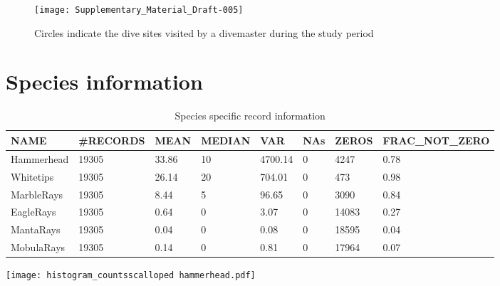 \documentclass[a4paper]{article}
\begin{document}

\begin{figure}[h!]
\texttt{[image: Supplementary\_Material\_Draft-005]}
\caption{Circles indicate the dive sites visited by a divemaster during the study period}
\end{figure}


\clearpage



\section{Species information}


\begin{table}[h!]
\centering
\begin{tabular}{llllllll}
  \hline
NAME & \#RECORDS & MEAN & MEDIAN & VAR & NAs & ZEROS & FRAC\_NOT\_ZERO \\ 
  \hline
Hammerhead & 19305 & 33.86 & 10 & 4700.14 & 0 & 4247 & 0.78 \\ 
  Whitetips & 19305 & 26.14 & 20 & 704.01 & 0 & 473 & 0.98 \\ 
  MarbleRays & 19305 & 8.44 & 5 & 96.65 & 0 & 3090 & 0.84 \\ 
  EagleRays & 19305 & 0.64 & 0 & 3.07 & 0 & 14083 & 0.27 \\ 
  MantaRays & 19305 & 0.04 & 0 & 0.08 & 0 & 18595 & 0.04 \\ 
  MobulaRays & 19305 & 0.14 & 0 & 0.81 & 0 & 17964 & 0.07 \\ 
   \hline
\end{tabular}
\caption{Species specific record information} 
\label{species_info}
\end{table}



\texttt{[image: histogram\_countsscalloped hammerhead.pdf]}
\end{document}
